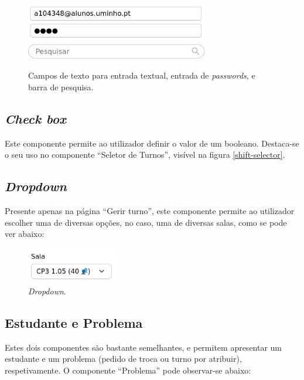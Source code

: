 \documentclass[12pt, a4paper]{article}
\begin{document}
\begin{figure}[H]
    \centering
    \includegraphics[width=8cm]{res/components/text-input-regular-password.png} \\
    \includegraphics[width=8cm]{res/components/text-input-search.png}
    \caption{
        Campos de texto para entrada textual, entrada de \emph{passwords}, e barra de pesquisa.
    }
    \label{text-input}
\end{figure}

\subsection{\emph{Check box}}

Este componente permite ao utilizador definir o valor de um booleano. Destaca-se o seu uso no
componente ``Seletor de Turnos'', visível na figura \ref{shift-selector}.

\subsection{\emph{Dropdown}}

Presente apenas na página ``Gerir turno'', este componente permite ao utilizador escolher uma de
diversas opções, no caso, uma de diversas salas, como se pode ver abaixo:

\begin{figure}[H]
    \centering
    \includegraphics[width=4cm]{res/components/dropdown.png}
    \caption{\emph{Dropdown}.}
    \label{dropdown}
\end{figure}

\subsection{Estudante e Problema}

Estes dois componentes são bastante semelhantes, e permitem apresentar um estudante e um problema
(pedido de troca ou turno por atribuir), respetivamente. O componente ``Problema'' pode observar-se
abaixo:
\end{document}
